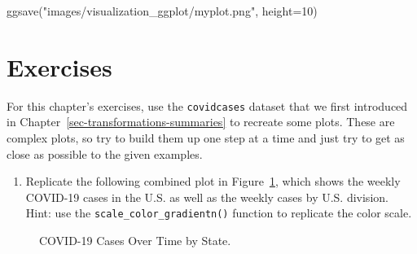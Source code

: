 \documentclass[
  letterpaper,
]{latex/krantz}
\makeatletter
\newenvironment{Shaded}{\begin{snugshade}}{\end{snugshade}}
\newcommand{\AttributeTok}[1]{\textcolor[rgb]{0.40,0.45,0.13}{#1}}
\newcommand{\DecValTok}[1]{\textcolor[rgb]{0.68,0.00,0.00}{#1}}
\newcommand{\FunctionTok}[1]{\textcolor[rgb]{0.28,0.35,0.67}{#1}}
\newcommand{\NormalTok}[1]{\textcolor[rgb]{0.00,0.23,0.31}{#1}}
\newcommand{\StringTok}[1]{\textcolor[rgb]{0.13,0.47,0.30}{#1}}
\providecommand{\tightlist}{%
  \setlength{\itemsep}{0pt}\setlength{\parskip}{0pt}}\usepackage{longtable,booktabs,array}
\newenvironment{kframe}{%
\medskip{}
\setlength{\fboxsep}{.8em}
 \def\at@end@of@kframe{}%
 \ifinner\ifhmode%
  \def\at@end@of@kframe{\end{minipage}}%
  \begin{minipage}{\columnwidth}%
 \fi\fi%
 \def\FrameCommand##1{\hskip\@totalleftmargin \hskip-\fboxsep
 \colorbox{shadecolor}{##1}\hskip-\fboxsep
     \hskip-\linewidth \hskip-\@totalleftmargin \hskip\columnwidth}%
 \MakeFramed {\advance\hsize-\width
   \@totalleftmargin\z@ \linewidth\hsize
   \@setminipage}}%
 {\par\unskip\endMakeFramed%
 \at@end@of@kframe}
\renewenvironment{Shaded}{\begin{kframe}}{\end{kframe}}
\makeatother
\begin{document}
\begin{Shaded}
\begin{Highlighting}[]
\FunctionTok{ggsave}\NormalTok{(}\StringTok{"images/visualization\_ggplot/myplot.png"}\NormalTok{, }\AttributeTok{height=}\DecValTok{10}\NormalTok{) }
\end{Highlighting}
\end{Shaded}

\section{Exercises}\label{exercises-5}

For this chapter's exercises, use the
\texttt{covidcases}
dataset that we first introduced in
Chapter~\ref{sec-transformations-summaries} to recreate some plots.
These are complex plots, so try to build them up one step at a time and
just try to get as close as possible to the given examples.

\begin{enumerate}
\def\labelenumi{\arabic{enumi}.}
\tightlist
\item
  Replicate the following combined plot in
  Figure~\ref{fig-covid-heatmap}, which shows the weekly COVID-19 cases
  in the U.S. as well as the weekly cases by U.S. division. Hint: use
  the \texttt{scale\_color\_gradientn()} function to replicate the color
  scale.
\end{enumerate}

\begin{figure}


\caption{\label{fig-covid-heatmap}COVID-19 Cases Over Time by State.}

\end{figure}%
\end{document}
